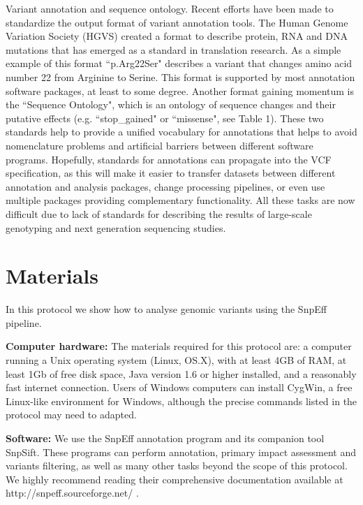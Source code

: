 \begin{framed}
{Variant annotation and sequence ontology. Recent efforts have been made to standardize the output format of variant annotation tools. The Human Genome Variation Society (HGVS) created a format to describe protein, RNA and DNA mutations that has emerged as a standard in translation research. As a simple example of this format ``p.Arg22Ser" describes a variant that changes amino acid number 22 from Arginine to Serine. This format is supported by most annotation software packages, at least to some degree. Another format gaining momentum is the ``Sequence Ontology", which is an ontology of sequence changes and their putative effects (e.g. ``stop\_gained" or ``missense", see Table 1). These two standards help to provide a unified vocabulary for annotations that helps to avoid nomenclature problems and artificial barriers between different software programs. Hopefully, standards for annotations can propagate into the VCF specification, as this will make it easier to transfer datasets between different annotation and analysis packages, change processing pipelines, or even use multiple packages providing complementary functionality. All these tasks are now difficult due to lack of standards for describing the results of large-scale genotyping and next generation sequencing studies. 
}
\end{framed}

\section{Materials}

In this protocol we show how to analyse genomic variants using the SnpEff pipeline.

\textbf{Computer hardware:} The materials required for this protocol are: a computer running a Unix operating system (Linux, OS.X), with at least 4GB of RAM, at least 1Gb of free disk space, Java version 1.6 or higher installed, and a reasonably fast internet connection. Users of Windows computers can install CygWin, a free Linux-like environment for Windows, although the precise commands listed in the protocol may need to adapted.

\textbf{Software:} We use the SnpEff annotation program and its companion tool SnpSift. These programs can perform annotation, primary impact assessment and variants filtering, as well as many other tasks beyond the scope of this protocol. We highly recommend reading their comprehensive documentation available at http://snpeff.sourceforge.net/ .


